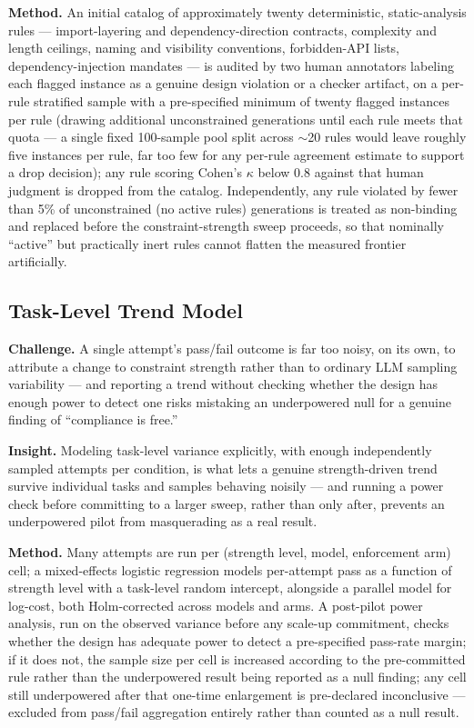 \documentclass[11pt]{article}
\begin{document}
\textbf{Method.} An initial catalog of approximately twenty deterministic, static-analysis rules --- import-layering and dependency-direction contracts, complexity and length ceilings, naming and visibility conventions, forbidden-API lists, dependency-injection mandates --- is audited by two human annotators labeling each flagged instance as a genuine design violation or a checker artifact, on a per-rule stratified sample with a pre-specified minimum of twenty flagged instances per rule (drawing additional unconstrained generations until each rule meets that quota --- a single fixed 100-sample pool split across $\sim$20 rules would leave roughly five instances per rule, far too few for any per-rule agreement estimate to support a drop decision); any rule scoring Cohen's $\kappa$ below 0.8 against that human judgment is dropped from the catalog. Independently, any rule violated by fewer than 5\% of unconstrained (no active rules) generations is treated as non-binding and replaced before the constraint-strength sweep proceeds, so that nominally ``active'' but practically inert rules cannot flatten the measured frontier artificially.

\subsection{Task-Level Trend Model}
\textbf{Challenge.} A single attempt's pass/fail outcome is far too noisy, on its own, to attribute a change to constraint strength rather than to ordinary LLM sampling variability --- and reporting a trend without checking whether the design has enough power to detect one risks mistaking an underpowered null for a genuine finding of ``compliance is free.''

\textbf{Insight.} Modeling task-level variance explicitly, with enough independently sampled attempts per condition, is what lets a genuine strength-driven trend survive individual tasks and samples behaving noisily --- and running a power check before committing to a larger sweep, rather than only after, prevents an underpowered pilot from masquerading as a real result.

\textbf{Method.} Many attempts are run per (strength level, model, enforcement arm) cell; a mixed-effects logistic regression models per-attempt pass as a function of strength level with a task-level random intercept, alongside a parallel model for log-cost, both Holm-corrected across models and arms. A post-pilot power analysis, run on the observed variance before any scale-up commitment, checks whether the design has adequate power to detect a pre-specified pass-rate margin; if it does not, the sample size per cell is increased according to the pre-committed rule rather than the underpowered result being reported as a null finding; any cell still underpowered after that one-time enlargement is pre-declared inconclusive --- excluded from pass/fail aggregation entirely rather than counted as a null result.
\end{document}
